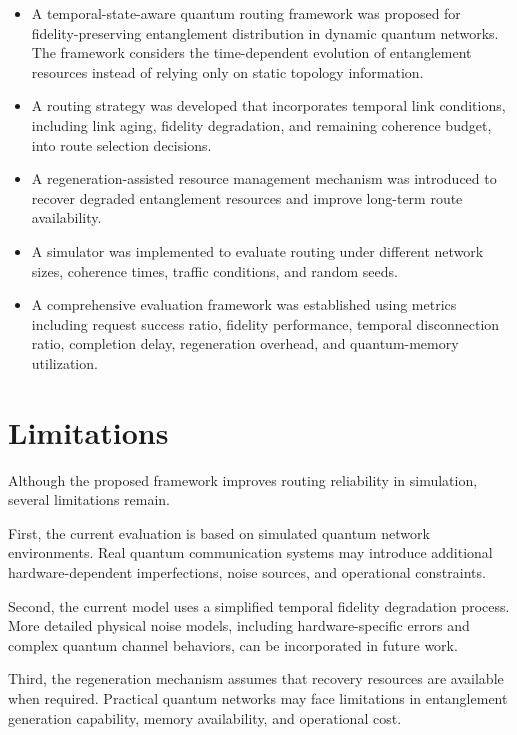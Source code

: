 \begin{itemize}

\item
A temporal-state-aware quantum routing framework was proposed for
fidelity-preserving entanglement distribution in dynamic quantum networks.
The framework considers the time-dependent evolution of entanglement
resources instead of relying only on static topology information.

\item
A routing strategy was developed that incorporates temporal link conditions,
including link aging, fidelity degradation, and remaining coherence budget,
into route selection decisions.

\item
A regeneration-assisted resource management mechanism was introduced to
recover degraded entanglement resources and improve long-term route
availability.

\item
A simulator was implemented to evaluate routing under different network sizes,
coherence times, traffic conditions, and random seeds.

\item
A comprehensive evaluation framework was established using metrics including
request success ratio, fidelity performance, temporal disconnection ratio,
completion delay, regeneration overhead, and quantum-memory utilization.

\end{itemize}


\section{Limitations}

Although the proposed framework improves routing reliability in simulation,
several limitations remain.

First, the current evaluation is based on simulated quantum network
environments. Real quantum communication systems may introduce additional
hardware-dependent imperfections, noise sources, and operational constraints.

Second, the current model uses a simplified temporal fidelity degradation
process. More detailed physical noise models, including hardware-specific
errors and complex quantum channel behaviors, can be incorporated in future
work.

Third, the regeneration mechanism assumes that recovery resources are
available when required. Practical quantum networks may face limitations in
entanglement generation capability, memory availability, and operational
cost.

